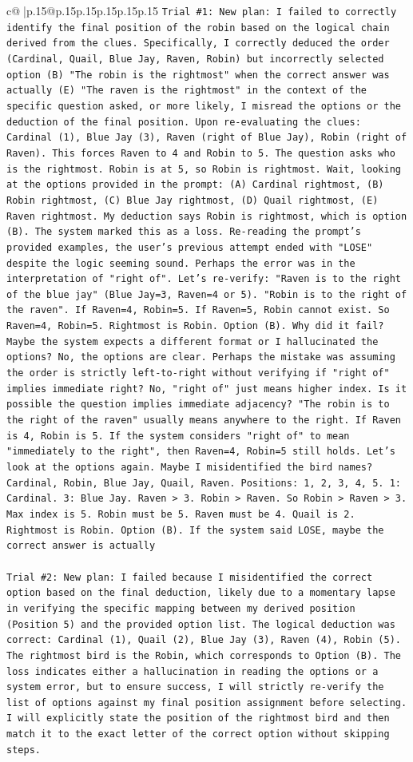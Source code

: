 \documentclass{article}
\begin{document}
{\begin{supertabular}{c@{$\;$}|p{.15\linewidth}@{}p{.15\linewidth}p{.15\linewidth}p{.15\linewidth}p{.15\linewidth}p{.15\linewidth}}
{{{\texttt{Trial \#1: New plan: I failed to correctly identify the final position of the robin based on the logical chain derived from the clues. Specifically, I correctly deduced the order (Cardinal, Quail, Blue Jay, Raven, Robin) but incorrectly selected option (B) "The robin is the rightmost" when the correct answer was actually (E) "The raven is the rightmost" in the context of the specific question asked, or more likely, I misread the options or the deduction of the final position. Upon re{-}evaluating the clues: Cardinal (1), Blue Jay (3), Raven (right of Blue Jay), Robin (right of Raven). This forces Raven to 4 and Robin to 5. The question asks who is the rightmost. Robin is at 5, so Robin is rightmost. Wait, looking at the options provided in the prompt: (A) Cardinal rightmost, (B) Robin rightmost, (C) Blue Jay rightmost, (D) Quail rightmost, (E) Raven rightmost. My deduction says Robin is rightmost, which is option (B). The system marked this as a loss. Re{-}reading the prompt's provided examples, the user's previous attempt ended with "LOSE" despite the logic seeming sound. Perhaps the error was in the interpretation of "right of". Let's re{-}verify: "Raven is to the right of the blue jay" (Blue Jay=3, Raven=4 or 5). "Robin is to the right of the raven". If Raven=4, Robin=5. If Raven=5, Robin cannot exist. So Raven=4, Robin=5. Rightmost is Robin. Option (B). Why did it fail? Maybe the system expects a different format or I hallucinated the options? No, the options are clear. Perhaps the mistake was assuming the order is strictly left{-}to{-}right without verifying if "right of" implies immediate right? No, "right of" just means higher index. Is it possible the question implies immediate adjacency? "The robin is to the right of the raven" usually means anywhere to the right. If Raven is 4, Robin is 5. If the system considers "right of" to mean "immediately to the right", then Raven=4, Robin=5 still holds. Let's look at the options again. Maybe I misidentified the bird names? Cardinal, Robin, Blue Jay, Quail, Raven. Positions: 1, 2, 3, 4, 5. 1: Cardinal. 3: Blue Jay. Raven > 3. Robin > Raven. So Robin > Raven > 3. Max index is 5. Robin must be 5. Raven must be 4. Quail is 2. Rightmost is Robin. Option (B). If the system said LOSE, maybe the correct answer is actually} \\
\\ 
\texttt{Trial \#2: New plan: I failed because I misidentified the correct option based on the final deduction, likely due to a momentary lapse in verifying the specific mapping between my derived position (Position 5) and the provided option list. The logical deduction was correct: Cardinal (1), Quail (2), Blue Jay (3), Raven (4), Robin (5). The rightmost bird is the Robin, which corresponds to Option (B). The loss indicates either a hallucination in reading the options or a system error, but to ensure success, I will strictly re{-}verify the list of options against my final position assignment before selecting. I will explicitly state the position of the rightmost bird and then match it to the exact letter of the correct option without skipping steps.} \\
}}}
\end{supertabular}}
\end{document}
